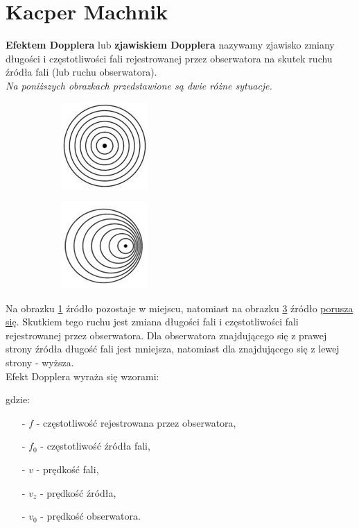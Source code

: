 \section{Kacper Machnik}
\textbf{Efektem Dopplera} lub \textbf{zjawiskiem Dopplera} nazywamy zjawisko zmiany długości i częstotliwości fali rejestrowanej przez obserwatora na skutek ruchu źródła fali (lub ruchu obserwatora).\\ 

\textit{Na poniższych obrazkach przedstawione są dwie różne sytuacje.}\\
\begin{figure}[H]

\begin{subfigure}{0.5\textwidth}
    \includegraphics[]{pictures/doppler1.jpg}
    \caption{}
    \label{fig:doppler1}
\end{subfigure}
\begin{subfigure}{0.5\textwidth}
    \includegraphics[]{pictures/doppler2.jpg}
    \caption{}
    \label{fig:doppler2}
\end{subfigure}

\end{figure}

Na obrazku \ref{fig:doppler1} źródło pozostaje w miejscu, natomiast na obrazku \ref{fig:doppler2} źródło \underline{porusza się}. Skutkiem tego ruchu jest zmiana długości fali i częstotliwości fali rejestrowanej przez obserwatora. Dla obserwatora znajdującego się z prawej strony źródła długość fali jest mniejsza, natomiast dla znajdującego się z lewej strony - wyższa.\\
 
Efekt Dopplera wyraża się wzorami:


gdzie:
\begin{itemize}
    \item [$\textbf{-}$]$f$ - częstotliwość rejestrowana przez obserwatora,
    \item [$\textbf{-}$]$f_0$ - częstotliwość źródła fali,
    \item [$\textbf{-}$]$v$ - prędkość fali,
    \item [$\textbf{-}$]$v_z$ - prędkość źródła,
    \item [$\textbf{-}$]$v_0$ - prędkość obserwatora.
\end{itemize}
\textwidth[1]{Przykłady}


